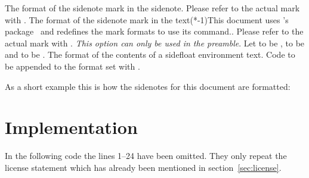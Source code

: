\documentclass[load-preamble+]{cnltx-doc}
\begin{document}
\begin{options}
    The format of the sidenote mark in the sidenote.  Please refer to the
    actual mark with .
    The format of the sidenote mark in the text\sidenote(*-1){This document
      uses \tennent's  package~\cite{pkg:libertine} and
      redefines the mark formats to use its  command.}.  Please
    refer to the actual mark with .
    \emph{This option can only be used in the preamble}. Let  to be ,
     to be  and  to be
    .
    The format of the contents of a sidefloat environment
    text.
    Code to be appended to the format set with
    .
\end{options}

\clearpage
As a short example this is how the sidenotes for this document are formatted:
\begin{sourcecode}
\end{sourcecode}


\section{Implementation}
In the following code the lines 1--24 have been omitted. They only repeat the
license statement which has already been mentioned in section~\ref{sec:license}.


 
\end{document}
